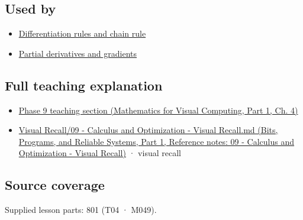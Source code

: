 \subsection{Used by}\label{appendix-a59658325cd6-used-by}

\hypertarget{appendix-a59658325cd6-used-by}{}

\begin{itemize}
\tightlist
\item
  \hyperref[appendix-d9f70bdfbc92]{Differentiation rules and chain rule}
\item
  \hyperref[appendix-677b59746ae0]{Partial derivatives and gradients}
\end{itemize}

\subsection{Full teaching explanation}\label{appendix-a59658325cd6-full-teaching-explanation}

\hypertarget{appendix-a59658325cd6-full-teaching-explanation}{}

\begin{itemize}
\tightlist
\item
  \href{../02-Mathematics-for-Visual-Computing-P01/main.pdf\#01-foundations-i-ch020-functions-limits-continuity-and-scalar-change}{Phase 9 teaching section (Mathematics for Visual Computing, Part 1, Ch. 4)}
\item
  \href{../01-Bits-Programs-and-Reliable-Systems-P01/main.pdf\#appendix-adf48f5dc5c1}{Visual Recall/09 - Calculus and Optimization - Visual Recall.md (Bits, Programs, and Reliable Systems, Part 1, Reference notes: 09 - Calculus and Optimization - Visual Recall)} · visual recall
\end{itemize}

\subsection{Source coverage}\label{appendix-a59658325cd6-source-coverage}

\hypertarget{appendix-a59658325cd6-source-coverage}{}

Supplied lesson parts: 801 (T04 · M049).
